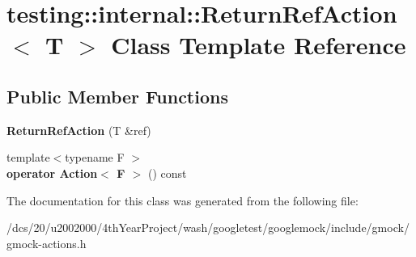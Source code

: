 \hypertarget{classtesting_1_1internal_1_1ReturnRefAction}{}\section{testing\+:\+:internal\+:\+:Return\+Ref\+Action$<$ T $>$ Class Template Reference}
\label{classtesting_1_1internal_1_1ReturnRefAction}
\subsection*{Public Member Functions}
\begin{DoxyCompactItemize}
\item 
\mbox{\label{classtesting_1_1internal_1_1ReturnRefAction_a1384b1cd78f3069f0493e2302f143701}} 
{\bfseries Return\+Ref\+Action} (T \&ref)
\item 
\mbox{\label{classtesting_1_1internal_1_1ReturnRefAction_a48e5d411097707e558af62eb68edc162}} 
{\footnotesize template$<$typename F $>$ }\\{\bfseries operator Action$<$ F $>$} () const
\end{DoxyCompactItemize}


The documentation for this class was generated from the following file\+:\begin{DoxyCompactItemize}
\item 
/dcs/20/u2002000/4th\+Year\+Project/wash/googletest/googlemock/include/gmock/gmock-\/actions.\+h\end{DoxyCompactItemize}
